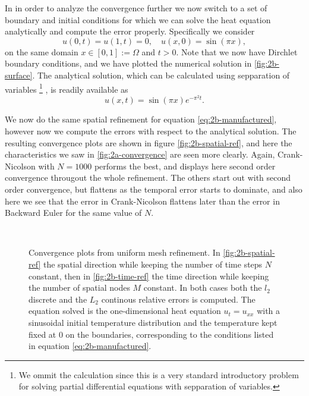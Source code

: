 In in order to analyze the convergence further we now switch to a set of boundary and initial conditions for which we can solve the heat equation analytically and compute the error properly. 
Specifically we consider 
\begin{equation}
    u(0,t) = u(1,t) = 0, \quad u(x,0) = \sin(\pi x), 
    \label{eq:2b-manufactured}
\end{equation}
on the same domain $x \in [0,1] := \Omega$ and $t > 0$. 
Note that we now have Dirchlet boundary conditions, 
and we have plotted the numerical solution in \ref{fig:2b-surface}. 
The analytical solution, 
which can be calculated using sepparation of variables
\footnote{
    We ommit the calculation since this is a very standard introductory problem for solving 
    partial differential equations with sepparation of variables. 
} \cite{Kreyszig}, 
is readily available as
\begin{equation}
    u(x,t) = \sin(\pi x)  e^{- \pi^2 t}.
\end{equation}

We now do the same spatial refinement for equation \eqref{eq:2b-manufactured}, 
however now we compute the errors with respect to the analytical solution. 
The resulting convergence plots are shown in figure \ref{fig:2b-spatial-ref}, 
and here the characteristics we saw in \ref{fig:2a-convergence} are seen more clearly. 
Again, Crank-Nicolson with $N=1000$ performs the best, 
and displays here second order convergence througout the whole refinement. 
The others start out with second order convergence, 
but flattens as the temporal error starts to dominate, 
and also here we see that the error in Crank-Nicolson flattens later than the error in Backward Euler for the same value of $N$. 
\begin{figure}
    \centering
     \\ \medskip
    \caption{
        Convergence plots from uniform mesh refinement. 
        In \ref{fig:2b-spatial-ref} the spatial direction while keeping the number of time steps $N$ constant, 
        then in \ref{fig:2b-time-ref} the time direction while keeping the number of spatial nodes $M$ constant. 
        In both cases 
        both the $l_2$ discrete and the $L_2$ continous relative errors is computed. 
        The equation solved is the one-dimensional heat equation $u_t=u_{xx}$ 
        with a sinusoidal initial temperature distribution and the temperature kept fixed at $0$ 
        on the boundaries, 
        corresponding to the conditions listed in equation \eqref{eq:2b-manufactured}. 
    }
\end{figure}


